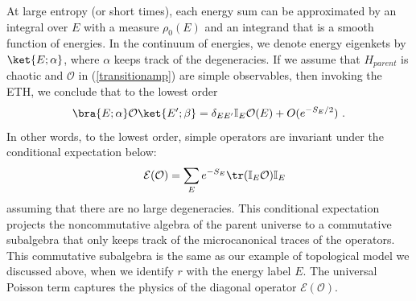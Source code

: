\documentclass[a4paper,11pt]{article}
\theoremstyle{definition}
\numberwithin{equation}{section}
\newcommand{\mE}{\mathcal{E}}
\newcommand{\mO}{\mathcal{O}}
\begin{document}
At large entropy (or short times), each energy sum can be approximated by an integral over $E$ with a measure $\rho_0(E)$ and an integrand that is a smooth function of energies. In the continuum of energies, we denote energy eigenkets by $\ket{E;\alpha}$, where $\alpha$ keeps track of the degeneracies. If we assume that $H_{parent}$ is chaotic and $\mO$ in (\ref{transitionamp}) are simple  observables, then invoking the ETH, we conclude that to the lowest order
\begin{eqnarray}
    \bra{E;\alpha}\mO\ket{E';\beta}=\delta_{EE'}\mathbb{I}_E\mO(E)+O(e^{-S_E/2})\ .
\end{eqnarray}
In other words, to the lowest order, simple operators are invariant under the conditional expectation below:
\begin{eqnarray}\label{conditionalexpec}
    &&\mathcal{E}(\mO)=\sum_E e^{-S_E}\tr(\mathbb{I}_E\mO)\mathbb{I}_E
\end{eqnarray}
assuming that there are no large degeneracies.
This conditional expectation projects the noncommutative algebra of the parent universe to a commutative subalgebra that only keeps track of the microcanonical traces of the operators. This commutative subalgebra is the same as our example of topological model we discussed above, when we identify $r$ with the energy label $E$. The universal Poisson term captures the physics of the diagonal operator $\mE(\mO)$.
\end{document}
